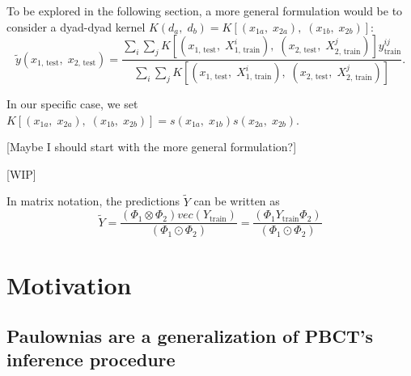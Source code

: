 \documentclass{article}
\begin{document}
To be explored in the following section, a more general formulation would be to consider a dyad-dyad kernel $K(d_a,\;d_b) = K[(x_{1a},\; x_{2a}),\; (x_{1b},\; x_{2b})]$:
%
\begin{equation}
    \label{eq:dyad-dyad}
    \tilde y (x_\text{1, test},\; x_\text{2, test}) = 
        \frac{
            \sum_i\sum_j
            K[(x_\text{1, test},\; X^i_\text{1, train}),\; (x_\text{2, test},\; X^j_\text{2, train})]
            y^{ij}_\text{train}
        }{
            \sum_i\sum_j
            K[(x_\text{1, test},\; X^i_\text{1, train}),\; (x_\text{2, test},\; X^j_\text{2, train})]
        }\text{.}
\end{equation}

In our specific case, we set $K[(x_{1a},\; x_{2a}),\; (x_{1b},\; x_{2b})] = s(x_{1a},\; x_{1b})s(x_{2a},\; x_{2b})$.

[Maybe I should start with the more general formulation?]

[WIP]

In matrix notation, the predictions $\tilde Y$ can be written as
%
\begin{equation}  %
    \tilde Y = 
        \frac{(\Phi_1 \otimes \Phi_2)
        vec(Y_\text{train})}{(\Phi_1 \odot \Phi_2)}
        =
        \frac{(\Phi_1 Y_\text{train} \Phi_2)
        }{(\Phi_1 \odot \Phi_2)}
\end{equation}


\section{Motivation}
\subsection{Paulownias are a generalization of PBCT's inference procedure}
\end{document}

